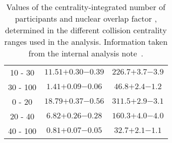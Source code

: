 \begin{table}[htb!]
\begin{tabular}{|c|c|c|}
  \hline%
  10 - 30   & $11.51 {+0.30} {-0.39}$  &   $226.7 {+3.7} {-3.9}$ \\   
  30 - 100  & $1.41 {+0.09} {-0.06}$   &   $46.8 {+2.4} {-1.2}$  \\
  \hline%
  0 - 20    & $18.79 {+0.37} {-0.56}$  &   $311.5 {+2.9} {-3.1}$ \\   
  20 - 40   & $6.82 {+0.26} {-0.28}$   &   $160.3 {+4.0} {-4.0}$ \\ 
  40 - 100  & $0.81 {+0.07} {-0.05}$   &   $32.7 {+2.1} {-1.1}$  \\ 
  \hline
 \end{tabular}
 \caption{Values of the centrality-integrated number of participants \avgnpart and nuclear overlap factor \avgtaa, determined in the different collision centrality ranges used in the analysis. Information taken from the internal analysis note~\cite{Centrality_PbPb}.}
 \label{tab:TAAValues}
\end{table}
